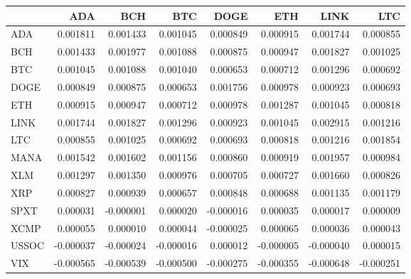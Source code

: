 \begin{tabular}{lrrrrrrr}
\toprule
 & ADA & BCH & BTC & DOGE & ETH & LINK & LTC \\
\midrule
ADA & 0.001811 & 0.001433 & 0.001045 & 0.000849 & 0.000915 & 0.001744 & 0.000855 \\
BCH & 0.001433 & 0.001977 & 0.001088 & 0.000875 & 0.000947 & 0.001827 & 0.001025 \\
BTC & 0.001045 & 0.001088 & 0.001040 & 0.000653 & 0.000712 & 0.001296 & 0.000692 \\
DOGE & 0.000849 & 0.000875 & 0.000653 & 0.001756 & 0.000978 & 0.000923 & 0.000693 \\
ETH & 0.000915 & 0.000947 & 0.000712 & 0.000978 & 0.001287 & 0.001045 & 0.000818 \\
LINK & 0.001744 & 0.001827 & 0.001296 & 0.000923 & 0.001045 & 0.002915 & 0.001216 \\
LTC & 0.000855 & 0.001025 & 0.000692 & 0.000693 & 0.000818 & 0.001216 & 0.001854 \\
MANA & 0.001542 & 0.001602 & 0.001156 & 0.000860 & 0.000919 & 0.001957 & 0.000984 \\
XLM & 0.001297 & 0.001350 & 0.000976 & 0.000705 & 0.000727 & 0.001660 & 0.000826 \\
XRP & 0.000827 & 0.000939 & 0.000657 & 0.000848 & 0.000688 & 0.001135 & 0.001179 \\
SPXT & 0.000031 & -0.000001 & 0.000020 & -0.000016 & 0.000035 & 0.000017 & 0.000009 \\
XCMP & 0.000055 & 0.000010 & 0.000044 & -0.000025 & 0.000065 & 0.000036 & 0.000043 \\
USSOC & -0.000037 & -0.000024 & -0.000016 & 0.000012 & -0.000005 & -0.000040 & 0.000015 \\
VIX & -0.000565 & -0.000539 & -0.000500 & -0.000275 & -0.000355 & -0.000648 & -0.000251 \\
\bottomrule
\end{tabular}
